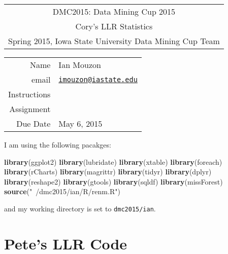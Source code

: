 \documentclass[10pt]{report}
\newenvironment{Shaded}{}{}
\newcommand{\KeywordTok}[1]{\textcolor[rgb]{0.00,0.44,0.13}{\textbf{{#1}}}}
\newcommand{\StringTok}[1]{\textcolor[rgb]{0.25,0.44,0.63}{{#1}}}
\newcommand{\NormalTok}[1]{{#1}}
\begin{document}
\thispagestyle{empty}%
\begin{center}%
    \renewcommand{\arraystretch}{1.5}%
    \begin{tabular}{c}%
       \Large{DMC2015: Data Mining Cup 2015}\\
       Cory's LLR Statistics\\
       Spring 2015, Iowa State University Data Mining Cup Team\\
    \end{tabular}
\end{center}

\begin{center}
 \renewcommand{\arraystretch}{1.5}
 \begin{tabular*}{0.65\textwidth}{r@{:\hspace{.3cm}}l}
    \hline
    Name& Ian Mouzon\\
    email& \href{mailto:imouzon@iastate.edu}{\nolinkurl{imouzon@iastate.edu}}\\
    Instructions& \\
    Assignment& \\
    Due Date&  May 6, 2015\\
    \hline
 \end{tabular*}
\end{center}

I am using the following pacakges:

\begin{Shaded}
\begin{Highlighting}[]
   \KeywordTok{library}\NormalTok{(ggplot2)}
   \KeywordTok{library}\NormalTok{(lubridate)}
   \KeywordTok{library}\NormalTok{(xtable)}
   \KeywordTok{library}\NormalTok{(foreach)}
   \KeywordTok{library}\NormalTok{(rCharts)}
   \KeywordTok{library}\NormalTok{(magrittr)}
   \KeywordTok{library}\NormalTok{(tidyr)}
   \KeywordTok{library}\NormalTok{(dplyr)}
   \KeywordTok{library}\NormalTok{(reshape2)}
   \KeywordTok{library}\NormalTok{(gtools)}
   \KeywordTok{library}\NormalTok{(sqldf)}
   \KeywordTok{library}\NormalTok{(missForest)}
   \KeywordTok{source}\NormalTok{(}\StringTok{"~/dmc2015/ian/R/renm.R"}\NormalTok{)}
\end{Highlighting}
\end{Shaded}

and my working directory is set to \verb!dmc2015/ian!.

\section{Pete's LLR Code}\label{petes-llr-code}
\end{document}
